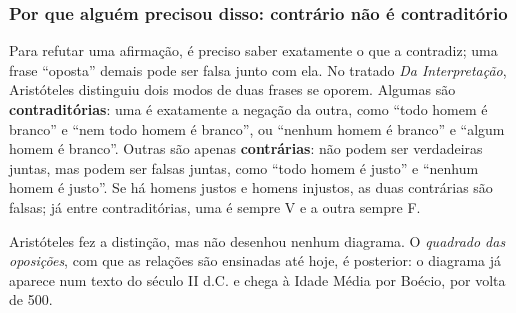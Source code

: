 \DeOndeVem

\subsubsection{Por que alguém precisou disso: contrário não é contraditório}
Para refutar uma afirmação, é preciso saber exatamente o que a contradiz; uma frase \enquote{oposta} demais pode ser falsa junto com ela. No tratado \emph{Da Interpretação}, Aristóteles distinguiu dois modos de duas frases se oporem. Algumas são \textbf{contraditórias}: uma é exatamente a negação da outra, como \enquote{todo homem é branco} e \enquote{nem todo homem é branco}, ou \enquote{nenhum homem é branco} e \enquote{algum homem é branco}. Outras são apenas \textbf{contrárias}: não podem ser verdadeiras juntas, mas podem ser falsas juntas, como \enquote{todo homem é justo} e \enquote{nenhum homem é justo}. Se há homens justos e homens injustos, as duas contrárias são falsas; já entre contraditórias, uma é sempre V e a outra sempre F.

Aristóteles fez a distinção, mas não desenhou nenhum diagrama. O \emph{quadrado das oposições}, com que as relações são ensinadas até hoje, é posterior: o diagrama já aparece num texto do século II d.C. e chega à Idade Média por Boécio, por volta de 500.

